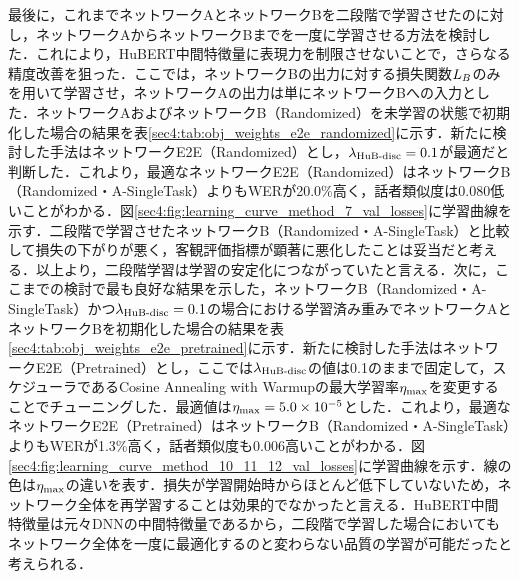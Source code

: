 最後に，これまでネットワークAとネットワークBを二段階で学習させたのに対し，ネットワークAからネットワークBまでを一度に学習させる方法を検討した．これにより，HuBERT中間特徴量に表現力を制限させないことで，さらなる精度改善を狙った．ここでは，ネットワークBの出力に対する損失関数$L_{B}$のみを用いて学習させ，ネットワークAの出力は単にネットワークBへの入力とした．ネットワークAおよびネットワークB（Randomized）を未学習の状態で初期化した場合の結果を表\ref{sec4:tab:obj_weights_e2e_randomized}に示す．新たに検討した手法はネットワークE2E（Randomized）とし，$\lambda_{\text{HuB-disc}} = 0.1$が最適だと判断した．これより，最適なネットワークE2E（Randomized）はネットワークB（Randomized・A-SingleTask）よりもWERが20.0\%高く，話者類似度は0.080低いことがわかる．図\ref{sec4:fig:learning_curve_method_7_val_losses}に学習曲線を示す．二段階で学習させたネットワークB（Randomized・A-SingleTask）と比較して損失の下がりが悪く，客観評価指標が顕著に悪化したことは妥当だと考える．以上より，二段階学習は学習の安定化につながっていたと言える．次に，ここまでの検討で最も良好な結果を示した，ネットワークB（Randomized・A-SingleTask）かつ$\lambda_{\text{HuB-disc}} = 0.1$の場合における学習済み重みでネットワークAとネットワークBを初期化した場合の結果を表\ref{sec4:tab:obj_weights_e2e_pretrained}に示す．新たに検討した手法はネットワークE2E（Pretrained）とし，ここでは$\lambda_{\text{HuB-disc}}$の値は0.1のままで固定して，スケジューラであるCosine Annealing with Warmupの最大学習率$\eta_{\text{max}}$を変更することでチューニングした．最適値は$\eta_{\text{max}} = 5.0 \times 10^{-5}$とした．これより，最適なネットワークE2E（Pretrained）はネットワークB（Randomized・A-SingleTask）よりもWERが1.3\%高く，話者類似度も0.006高いことがわかる．図\ref{sec4:fig:learning_curve_method_10_11_12_val_losses}に学習曲線を示す．線の色は$\eta_{\text{max}}$の違いを表す．損失が学習開始時からほとんど低下していないため，ネットワーク全体を再学習することは効果的でなかったと言える．HuBERT中間特徴量は元々DNNの中間特徴量であるから，二段階で学習した場合においてもネットワーク全体を一度に最適化するのと変わらない品質の学習が可能だったと考えられる．


